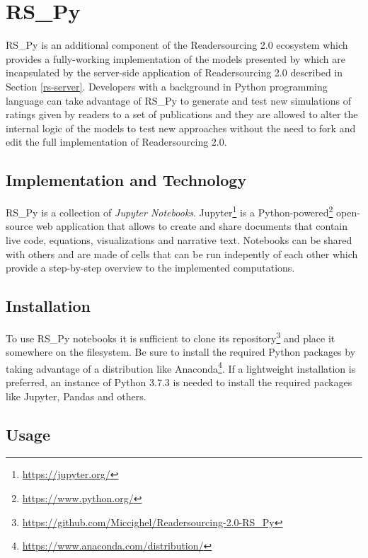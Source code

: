 \documentclass[a4paper, english]{article}
\begin{document}
\section{RS\_Py}

\label{rs-py}

RS\_Py \cite{RS-Py} is an additional component of the Readersourcing 2.0 ecosystem which provides a fully-working implementation of the models presented by \citet{Soprano2019} which are incapsulated by the server-side application of Readersourcing 2.0 described in Section \ref{rs-server}. Developers with a background in Python programming language can take advantage of RS\_Py to generate and test new simulations of ratings given by readers to a set of publications and they are allowed to alter the internal logic of the models to test new approaches without the need to fork and edit the full implementation of Readersourcing 2.0.

\subsection{Implementation and Technology}

RS\_Py is a collection of \emph{Jupyter Notebooks}. Jupyter\footnote{\url{https://jupyter.org/}} is a Python-powered\footnote{\url{https://www.python.org/}} open-source web application that allows to create and share documents that contain live code, equations, visualizations and narrative text. Notebooks can be shared with others and are made of cells that can be run indepently of each other which provide a step-by-step overview to the implemented computations. 

\subsection{Installation}

To use RS\_Py notebooks it is sufficient to clone its repository\footnote{\url{https://github.com/Miccighel/Readersourcing-2.0-RS_Py}} and place it somewhere on the filesystem. Be sure to install the required Python packages by taking advantage of a distribution like Anaconda\footnote{\url{https://www.anaconda.com/distribution/}}. If a lightweight installation is preferred, an instance of Python $3.7.3$ is needed to install the required packages like Jupyter, Pandas and others.

\subsection{Usage}
\end{document}
